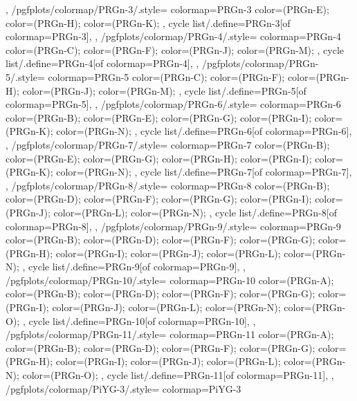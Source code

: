 {{  },
  /pgfplots/colormap/PRGn-3/.style={
    colormap={PRGn-3}{
      color=(PRGn-E);
      color=(PRGn-H);
      color=(PRGn-K);
    },
    cycle list/.define={PRGn-3}{[of colormap=PRGn-3]},
  },
  /pgfplots/colormap/PRGn-4/.style={
    colormap={PRGn-4}{
      color=(PRGn-C);
      color=(PRGn-F);
      color=(PRGn-J);
      color=(PRGn-M);
    },
    cycle list/.define={PRGn-4}{[of colormap=PRGn-4]},
  },
  /pgfplots/colormap/PRGn-5/.style={
    colormap={PRGn-5}{
      color=(PRGn-C);
      color=(PRGn-F);
      color=(PRGn-H);
      color=(PRGn-J);
      color=(PRGn-M);
    },
    cycle list/.define={PRGn-5}{[of colormap=PRGn-5]},
  },
  /pgfplots/colormap/PRGn-6/.style={
    colormap={PRGn-6}{
      color=(PRGn-B);
      color=(PRGn-E);
      color=(PRGn-G);
      color=(PRGn-I);
      color=(PRGn-K);
      color=(PRGn-N);
    },
    cycle list/.define={PRGn-6}{[of colormap=PRGn-6]},
  },
  /pgfplots/colormap/PRGn-7/.style={
    colormap={PRGn-7}{
      color=(PRGn-B);
      color=(PRGn-E);
      color=(PRGn-G);
      color=(PRGn-H);
      color=(PRGn-I);
      color=(PRGn-K);
      color=(PRGn-N);
    },
    cycle list/.define={PRGn-7}{[of colormap=PRGn-7]},
  },
  /pgfplots/colormap/PRGn-8/.style={
    colormap={PRGn-8}{
      color=(PRGn-B);
      color=(PRGn-D);
      color=(PRGn-F);
      color=(PRGn-G);
      color=(PRGn-I);
      color=(PRGn-J);
      color=(PRGn-L);
      color=(PRGn-N);
    },
    cycle list/.define={PRGn-8}{[of colormap=PRGn-8]},
  },
  /pgfplots/colormap/PRGn-9/.style={
    colormap={PRGn-9}{
      color=(PRGn-B);
      color=(PRGn-D);
      color=(PRGn-F);
      color=(PRGn-G);
      color=(PRGn-H);
      color=(PRGn-I);
      color=(PRGn-J);
      color=(PRGn-L);
      color=(PRGn-N);
    },
    cycle list/.define={PRGn-9}{[of colormap=PRGn-9]},
  },
  /pgfplots/colormap/PRGn-10/.style={
    colormap={PRGn-10}{
      color=(PRGn-A);
      color=(PRGn-B);
      color=(PRGn-D);
      color=(PRGn-F);
      color=(PRGn-G);
      color=(PRGn-I);
      color=(PRGn-J);
      color=(PRGn-L);
      color=(PRGn-N);
      color=(PRGn-O);
    },
    cycle list/.define={PRGn-10}{[of colormap=PRGn-10]},
  },
  /pgfplots/colormap/PRGn-11/.style={
    colormap={PRGn-11}{
      color=(PRGn-A);
      color=(PRGn-B);
      color=(PRGn-D);
      color=(PRGn-F);
      color=(PRGn-G);
      color=(PRGn-H);
      color=(PRGn-I);
      color=(PRGn-J);
      color=(PRGn-L);
      color=(PRGn-N);
      color=(PRGn-O);
    },
    cycle list/.define={PRGn-11}{[of colormap=PRGn-11]},
  },
  /pgfplots/colormap/PiYG-3/.style={
    colormap={PiYG-3}{
}}}
